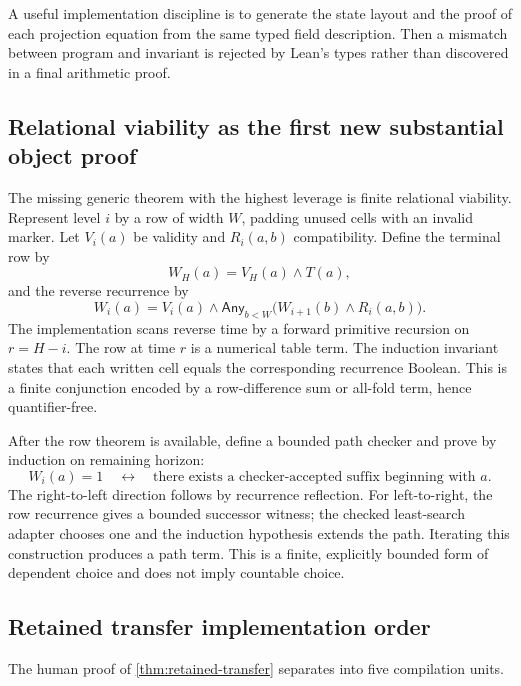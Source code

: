 A useful implementation discipline is to generate the state layout and the proof of each projection equation from the same typed field description.  Then a mismatch between program and invariant is rejected by Lean's types rather than discovered in a final arithmetic proof.

\subsection{Relational viability as the first new substantial object proof}

The missing generic theorem with the highest leverage is finite relational viability.  Represent level \(i\) by a row of width \(W\), padding unused cells with an invalid marker.  Let \(V_i(a)\) be validity and \(R_i(a,b)\) compatibility.  Define the terminal row by
\[
  W_H(a)=V_H(a)\wedge T(a),
\]
and the reverse recurrence by
\[
  W_i(a)=V_i(a)\wedge
  \mathsf{Any}_{b<W}\bigl(W_{i+1}(b)\wedge R_i(a,b)\bigr).
\]
The implementation scans reverse time by a forward primitive recursion on \(r=H-i\).  The row at time \(r\) is a numerical table term.  The induction invariant states that each written cell equals the corresponding recurrence Boolean.  This is a finite conjunction encoded by a row-difference sum or all-fold term, hence quantifier-free.

After the row theorem is available, define a bounded path checker and prove by induction on remaining horizon:
\[
 W_i(a)=1
 \quad\leftrightarrow\quad
 \text{there exists a checker-accepted suffix beginning with }a.
\]
The right-to-left direction follows by recurrence reflection.  For left-to-right, the row recurrence gives a bounded successor witness; the checked least-search adapter chooses one and the induction hypothesis extends the path.  Iterating this construction produces a path term.  This is a finite, explicitly bounded form of dependent choice and does not imply countable choice.

\subsection{Retained transfer implementation order}

The human proof of \cref{thm:retained-transfer} separates into five compilation units.

